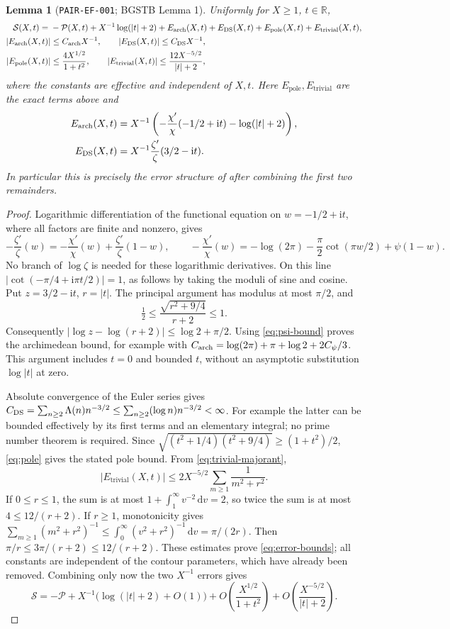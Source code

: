 \documentclass[11pt]{article}
\newtheorem{lemma}{Lemma}
\newcommand{\dd}{\,\mathrm d}
\newcommand{\ii}{\mathrm i}
\newcommand{\ZL}{\frac{\zeta'}{\zeta}}
\newcommand{\ZS}{\mathcal S}
\newcommand{\PS}{\mathcal P}
\newcommand{\EP}{E_{\mathrm{pole}}}
\newcommand{\ET}{E_{\mathrm{trivial}}}
\newcommand{\EA}{E_{\mathrm{arch}}}
\newcommand{\ED}{E_{\mathrm{DS}}}
\begin{document}
\begin{lemma}[\texttt{PAIR-EF-001}; BGSTB Lemma 1]\label{lem:pair-ef}
Uniformly for \(X\geq1\), \(t\in\mathbb R\),
\begin{align}
 \ZS(X,t)={}&-\PS(X,t)+X^{-1}\log(|t|+2)
       +\EA(X,t)+\ED(X,t)+\EP(X,t)+\ET(X,t),
       \label{eq:budget}\\
 |\EA(X,t)|&\leq C_{\rm arch}X^{-1},\qquad
 |\ED(X,t)|\leq C_{\rm DS}X^{-1},\notag\\
 |\EP(X,t)|&\leq\frac{4X^{1/2}}{1+t^2},\qquad
 |\ET(X,t)|\leq\frac{12X^{-5/2}}{|t|+2},\label{eq:error-bounds}
\end{align}
where the constants are effective and independent of \(X,t\).
Here \(\EP,\ET\) are the exact terms above and
\begin{align}
 \EA(X,t)&=X^{-1}\left(-\frac{\chi'}{\chi}(-1/2+\ii t)
                               -\log(|t|+2)\right),\notag\\
 \ED(X,t)&=X^{-1}\ZL(3/2-\ii t).\label{eq:arch-ds}
\end{align}
In particular this is precisely the error structure of
\cite[Lemma 1, (2.2)]{BGSTB2024} after combining the first two remainders.
\end{lemma}
\begin{proof}
Logarithmic differentiation of the functional equation on
\(w=-1/2+\ii t\), where all factors are finite and nonzero, gives
\[
 -\ZL(w)=-\frac{\chi'}{\chi}(w)+\ZL(1-w),\qquad
 -\frac{\chi'}{\chi}(w)
 =-\log(2\pi)-\frac\pi2\cot(\pi w/2)+\psi(1-w).
\]
No branch of \(\log\zeta\) is needed for these logarithmic
derivatives. On this line
\(\lvert\cot(-\pi/4+\ii\pi t/2)\rvert=1\), as follows by taking
the moduli of sine and cosine. Put \(z=3/2-\ii t\), \(r=|t|\).
The principal argument has modulus at most \(\pi/2\), and
\[
 \tfrac12\leq\frac{\sqrt{r^2+9/4}}{r+2}\leq1.
\]
Consequently \(\lvert\log z-\log(r+2)\rvert\leq\log2+\pi/2\).
Using \eqref{eq:psi-bound} proves the archimedean bound, for example with
\(C_{\rm arch}=\log(2\pi)+\pi+\log2+2C_\psi/3\).
This argument includes \(t=0\) and bounded \(t\), without an
asymptotic substitution \(\log|t|\) at zero.

Absolute convergence of the Euler series gives
\(C_{\rm DS}=\sum_{n\geq2}\Lambda(n)n^{-3/2}\leq
\sum_{n\geq2}(\log n)n^{-3/2}<\infty\).
For example the latter can be bounded effectively by its first terms
and an elementary integral; no prime number theorem is required.
Since
\(\sqrt{(t^2+1/4)(t^2+9/4)}\geq(1+t^2)/2\),
\eqref{eq:pole} gives the stated pole bound.
From \eqref{eq:trivial-majorant},
\[
 |\ET(X,t)|\leq2X^{-5/2}\sum_{m\geq1}\frac1{m^2+r^2}.
\]
If \(0\leq r\leq1\), the sum is at most
\(1+\int_1^\infty v^{-2}\dd v=2\), so twice the sum is at most
\(4\leq12/(r+2)\).
If \(r\geq1\), monotonicity gives
\(\sum_{m\geq1}(m^2+r^2)^{-1}\leq
\int_0^\infty(v^2+r^2)^{-1}\dd v=\pi/(2r)\).
Then \(\pi/r\leq3\pi/(r+2)\leq12/(r+2)\).
These estimates prove \eqref{eq:error-bounds}; all constants are
independent of the contour parameters, which have already been removed.
Combining only now the two \(X^{-1}\) errors gives
\[
 \ZS=-\PS+X^{-1}\bigl(\log(|t|+2)+O(1)\bigr)
 +O\!\left(\frac{X^{1/2}}{1+t^2}\right)
 +O\!\left(\frac{X^{-5/2}}{|t|+2}\right).
\]
\end{proof}
\end{document}

